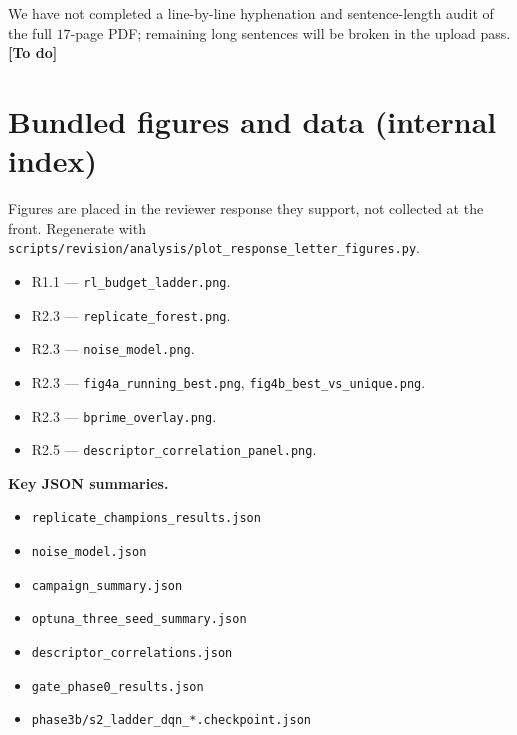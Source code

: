 \documentclass[11pt]{article}
\newcommand{\placeholder}{\textcolor{orange!80!black}{\textbf{[To do]}}}
\begin{document}
We have not completed a line-by-line hyphenation and sentence-length audit of the full $17$-page PDF; remaining long sentences will be broken in the upload pass. \placeholder

\bigskip

\section*{Bundled figures and data (internal index)}

\noindent Figures are placed in the reviewer response they support, not collected at the front.
Regenerate with \texttt{scripts/revision/analysis/plot\_response\_letter\_figures.py}.
\begin{itemize}[nosep]
  \item R1.1 --- \texttt{rl\_budget\_ladder.png}.
  \item R2.3 --- \texttt{replicate\_forest.png}.
  \item R2.3 --- \texttt{noise\_model.png}.
  \item R2.3 --- \texttt{fig4a\_running\_best.png}, \texttt{fig4b\_best\_vs\_unique.png}.
  \item R2.3 --- \texttt{bprime\_overlay.png}.
  \item R2.5 --- \texttt{descriptor\_correlation\_panel.png}.
\end{itemize}

\noindent\textbf{Key JSON summaries.}
\begin{itemize}[nosep]
  \item \texttt{replicate\_champions\_results.json}
  \item \texttt{noise\_model.json}
  \item \texttt{campaign\_summary.json}
  \item \texttt{optuna\_three\_seed\_summary.json}
  \item \texttt{descriptor\_correlations.json}
  \item \texttt{gate\_phase0\_results.json}
  \item \texttt{phase3b/s2\_ladder\_dqn\_*.checkpoint.json}
\end{itemize}
\end{document}
